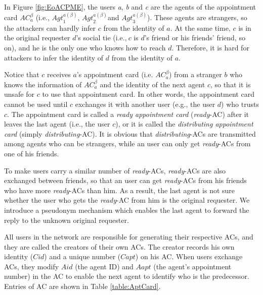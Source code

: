 In Figure \ref{fig:EoACPME}, the users \textit{a}, \textit{b} and \textit{c} are the agents of the appointment card ${AC}^{\beta }_a$ (i.e., ${Agt}^{a\left(\beta \right)}_1$, ${Agt}^{a\left(\beta \right)}_2$and ${Agt}^{a\left(\beta \right)}_3$). These agents are strangers, so the attackers can hardly infer $c$ from the identity of $a$. At the same time, $c$ is in the original requester $d$'s social tie (i.e.,$\ c$ is $d$'s friend or his friends' friend, so on), and he is the only one who knows how to reach $d$. Therefore, it is hard for attackers to infer the identity of $d$ from the identity of $a$.

Notice that $c$ receives $a$'s appointment card (i.e. ${AC}^{\beta }_a$) from a stranger $b$ who knows the information of ${AC}^{\beta }_a$ and the identity of the next agent $c$, so that it is unsafe for $c$ to use that appointment card. In other words, the appointment card cannot be used until $c$ exchanges it with another user (e.g., the user $d$) who trusts $c$. The appointment card is called a \textit{ready appointment card} (\textit{ready}-AC) after it leaves the last agent (i.e., the user $c$), or it is called the \textit{distributing appointment card} (simply \textit{distributing}-AC). It is obvious that \textit{distributing}-ACs are transmitted among agents who can be strangers, while an user can only get \textit{ready}-ACs from one of his friends.

To make users carry a similar number of \textit{ready}-ACs, \textit{ready}-ACs are also exchanged between friends, so that an user can get \textit{ready}-ACs from his friends who have more \textit{ready}-ACs than him. As a result, the last agent is not sure whether the user who gets the \textit{ready}-AC from him is the original requester. We introduce a pseudonym mechanism which enables the last agent to forward the reply to the unknown original requester. 

All users in the network are responsible for generating their respective ACs, and they are called the creators of their own ACs. The creator records his own identity ($Cid$) and a unique number ($Capt$) on his AC. When users exchange ACs, they modify $Aid$ (the agent ID) and ${Aapt}$ (the agent's appointment number) in the AC to enable the next agent to identify who is the predecessor. Entries of AC are shown in Table \ref{table:AptCard}.


